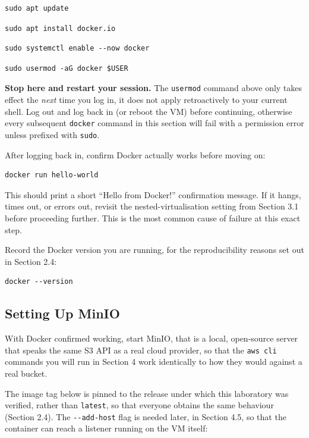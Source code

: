 \begin{lstlisting}
sudo apt update
\end{lstlisting}
\begin{lstlisting}
sudo apt install docker.io
\end{lstlisting}
\begin{lstlisting}
sudo systemctl enable --now docker
\end{lstlisting}
\begin{lstlisting}
sudo usermod -aG docker $USER
\end{lstlisting}

\begin{warningbox}
\textbf{Stop here and restart your session.} The \texttt{usermod} command above only takes
effect the \emph{next} time you log in, it does not apply retroactively to your current
shell. Log out and log back in (or reboot the VM) before continuing, otherwise every subsequent
\texttt{docker} command in this section will fail with a permission error unless prefixed with
\texttt{sudo}.
\end{warningbox}

\noindent
After logging back in, confirm Docker actually works before moving on:
\begin{lstlisting}
docker run hello-world
\end{lstlisting}
This should print a short ``Hello from Docker!'' confirmation message. If it hangs, times out, or
errors out, revisit the nested-virtualisation setting from Section 3.1 before proceeding further. This is the most common cause of failure at this exact step.
\medskip

\noindent
Record the Docker version you are running, for the reproducibility reasons set out in Section 2.4:
\begin{lstlisting}
docker --version
\end{lstlisting}

\subsection{Setting Up MinIO}

With Docker confirmed working, start MinIO, that is a local, open-source server that speaks the same S3 API as a real cloud provider, so that the \texttt{aws cli} commands you will run in Section 4 work identically to how they would against a real bucket.
\medskip

\noindent
The image tag below is pinned to the release under which this laboratory was verified, rather than
\texttt{latest}, so that everyone obtains the same behaviour (Section 2.4). The
\texttt{-\/-add-host} flag is needed later, in Section 4.5, so that the container can reach a
listener running on the VM itself:


